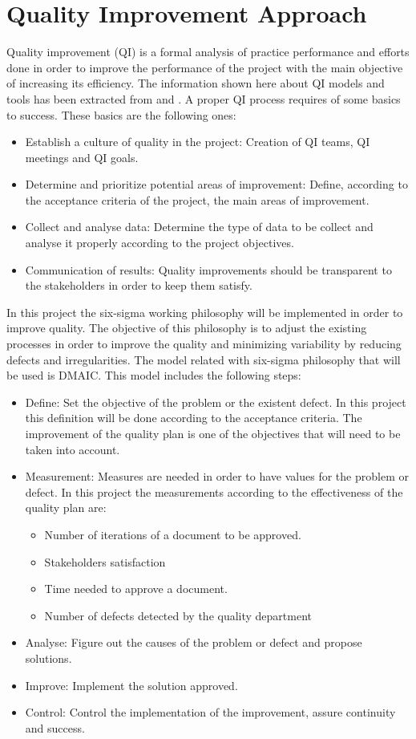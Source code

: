 \section{Quality Improvement Approach}
Quality improvement (QI) is a formal analysis of practice performance and efforts done in order to improve the performance of the project with the main objective of increasing its efficiency. The information shown here about QI models and tools has been extracted from \cite{aafp} and \cite{leansolutions}. A proper QI process requires of some basics to success. These basics are the following ones:
\begin{itemize}
\item Establish a culture of quality in the project: Creation of QI teams, QI meetings and QI goals.
\item Determine and prioritize potential areas of improvement: Define, according to the acceptance criteria of the project, the main areas of improvement.
\item Collect and analyse data: Determine the type of data to be collect and analyse it properly according to the project objectives.
\item Communication of results: Quality improvements should be transparent to the stakeholders in order to keep them satisfy. 
\end{itemize}
In this project the six-sigma working philosophy will be implemented in order to improve quality. The objective of this philosophy is to adjust the existing processes in order to improve the quality and minimizing variability by reducing defects and irregularities. The model related with six-sigma philosophy that will be used is DMAIC. This model includes the following steps:
\begin{itemize}
\item Define: Set the objective of the problem or the existent defect. In this project this definition will be done according to the acceptance criteria. The improvement of the quality plan is one of the objectives that will need to be taken into account.
\item Measurement: Measures are needed in order to have values for the problem or defect. In this project the measurements according to the effectiveness of the quality plan are:
\begin{itemize}
\item Number of iterations of a document to be approved.
\item Stakeholders satisfaction
\item Time needed to approve a document.
\item Number of defects detected by the quality department
\end{itemize}
\item Analyse: Figure out the causes of the problem or defect and propose solutions.
\item Improve: Implement the solution approved.
\item Control: Control the implementation of the improvement, assure continuity and success.
\end{itemize}